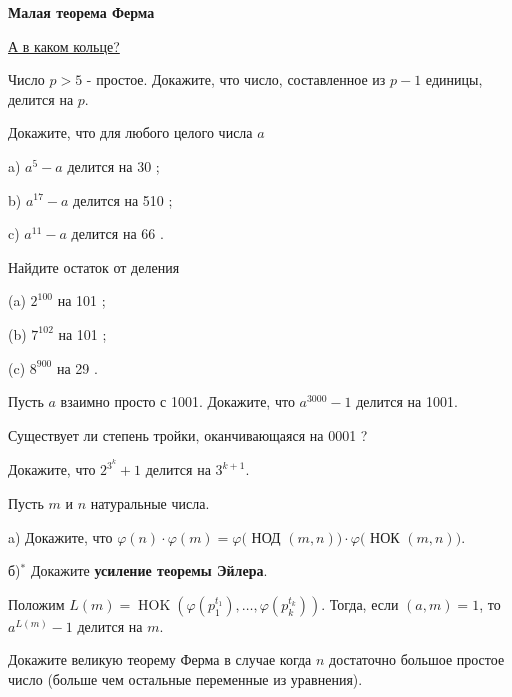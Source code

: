 \centerline{\bf \Huge Малая теорема Ферма}
\centerline{\bf \Huge }

\begin{flushright}
        \scriptsize{\href{https://www.youtube.com/watch?v=xwvKcWa2vLM&t=10s}{А в каком кольце?}}
\end{flushright}

Число $p>5$ - простое. Докажите, что число, составленное из $p-1$ единицы, делится на $p$.

Докажите, что для любого целого числа $a$

a) $a^5-a$ делится на 30 ;

b) $a^{17}-a$ делится на 510 ;

c) $a^{11}-a$ делится на 66 .

Найдите остаток от деления

(a) $2^{100}$ на 101 ;

(b) $7^{102}$ на 101 ;

(c) $8^{900}$ на 29 .

Пусть $a$ взаимно просто с 1001. Докажите, что $a^{3000}-1$ делится на 1001.

Существует ли степень тройки, оканчивающаяся на 0001 ?

Докажите, что $2^{3^k}+1$ делится на $3^{k+1}$.

Пусть $m$ и $n$ натуральные числа.

a) Докажите, что $\varphi(n) \cdot \varphi(m)=\varphi($ НОД $(m, n)) \cdot \varphi($ НОК $(m, n))$.

б)$^{*}$ Докажите \textbf{усиление теоремы Эйлера}. 

Положим $L(m)=\operatorname{HOK}\left(\varphi\left(p_1^{t_1}\right), \ldots, \varphi\left(p_k^{t_k}\right)\right)$. Тогда, если $(a, m)=1$, то $a^{L(m)}-1$ делится на $m$.

Докажите великую теорему Ферма в случае когда $n$ достаточно большое простое число (больше чем остальные переменные из уравнения).